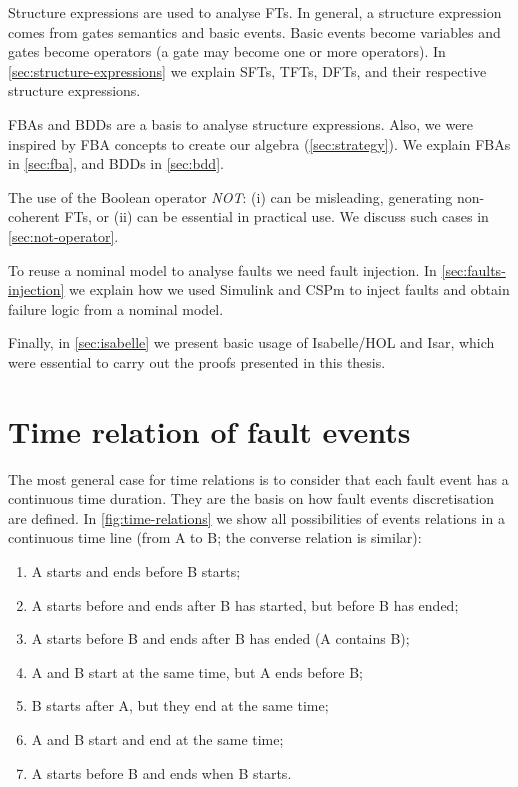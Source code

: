 \documentclass[en,twoside,onehalfspacing,phd]{risethesis}
\newcommand{\simulink}{Simulink\xspace}
\begin{document}
Structure expressions are used to analyse \aclp{FT}.
In general, a structure expression comes from gates semantics and basic events.
Basic events become variables and gates become operators (a gate may become one or more operators).
In \cref{sec:structure-expressions} we explain \acp{SFT}, \acp{TFT}, \acp{DFT}, and their respective structure expressions.

\Acp{FBA} and \acp{BDD} are a basis to analyse structure expressions. 
Also, we were inspired by \ac{FBA} concepts to create our \acl{algebra} (\cref{sec:strategy}).
We explain \acp{FBA} in \cref{sec:fba}, and \acp{BDD} in \cref{sec:bdd}.

The use of the Boolean operator \emph{NOT}: (i) can be misleading, generating non-coherent \aclp{FT}, or (ii) can be essential in practical use.
We discuss such cases in \cref{sec:not-operator}.

To reuse a nominal model to analyse faults we need fault injection.
In \cref{sec:faults-injection} we explain how we used \simulink and \ac{CSPm} to inject faults and obtain failure logic from a nominal model.

Finally, in \cref{sec:isabelle} we present basic usage of Isabelle/HOL and \ac{Isar}, which were essential to carry out the proofs presented in this thesis.

\section{Time relation of fault events}
\label{sec:time-relations}

The most general case for time relations is to consider that each fault event has a continuous time duration.
They are the basis on how fault events discretisation are defined.
In \cref{fig:time-relations} we show all possibilities of events relations in a continuous time line (from A to B; the converse relation is similar):

\begin{enumerate}\renewcommand{\theenumi}{\alph{enumi}}
  \item A starts and ends before B starts;
  \item A starts before and ends after B has started, but before B has ended;
  \item A starts before B and ends after B has ended (A contains B);
  \item A and B start at the same time, but A ends before B;
  \item B starts after A, but they end at the same time;
  \item A and B start and end at the same time;
  \item A starts before B and ends when B starts.
\end{enumerate}
\end{document}

